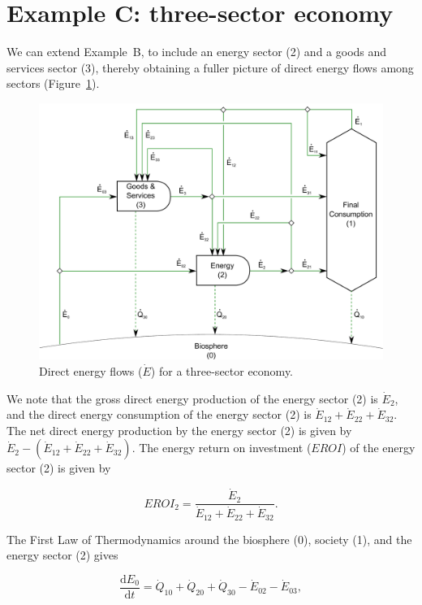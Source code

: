 \section{Example C: three-sector economy} %
\label{sec:C_energy}

We can extend Example~B, to include an energy sector (2) 
and a goods and services sector (3), thereby obtaining
a fuller picture of direct energy flows among sectors
(Figure~\ref{fig:C_energy}).

\begin{figure}[!ht]
\centering
\includegraphics[width=0.8\linewidth]{Part_1/Chapter_Energy/images/3_sector_direct_energy.pdf}
\caption[Direct energy flows for a three-sector economy.]{Direct energy flows ($\dot{E}$) for a three-sector economy.}
\label{fig:C_energy}
\end{figure}

We note that the gross direct energy production of the energy sector (2) is 
$\dot{E}_{2}$, and the direct energy consumption of the energy sector (2) is 
$\dot{E}_{12} + \dot{E}_{22} + \dot{E}_{32}$. 
The net direct energy production by the energy sector (2)
is given by $\dot{E}_{2} - (\dot{E}_{12} + \dot{E}_{22} + \dot{E}_{32})$.
The energy return on investment 
($EROI$) of the energy sector (2) is given by

\begin{equation} \label{eq:C-EROI}
	EROI_2 
	= \frac{\dot{E}_{2}}{\dot{E}_{12} + \dot{E}_{22} + \dot{E}_{32}}.
\end{equation}

The First Law of Thermodynamics around the 
biosphere (0), society (1), and the energy sector (2) gives

\begin{equation} \label{eq:C-CV_E_dot_0}
	\frac{\mathrm{d}E_{0}}{\mathrm{d}t} 	 
	= \dot{Q}_{10} 
	+ \dot{Q}_{20} 
	+ \dot{Q}_{30} 
	- \dot{E}_{02} 
	- \dot{E}_{03},
\end{equation}

